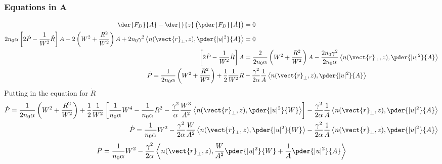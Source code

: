 \subsubsection{ Equations in A}
\begin{equation}
\begin{split}
    \der{F_{D}}{A}  - \der{}{z}\left(\pder{F_{D}}{\dot{A}}\right) &= 0 \\
    2n_0 \alpha \left[2\dot{P} - \frac{1}{W^2} \dot{R} \right] A  -  2 \left(W^2 + \frac{R^2}{W^2}\right) A +  2n_0 \gamma^2 \left< n(\vect{r}_{\perp},z),\pder{|u|^2}{A}\right> &= 0 \\
       \left[2\dot{P} - \frac{1}{W^2} \dot{R} \right] A  &=  \frac{2}{2n_0 \alpha} \left(W^2 + \frac{R^2}{W^2}\right) A -  \frac{2n_0 \gamma^2}{2n_0 \alpha} \left< n(\vect{r}_{\perp},z),\pder{|u|^2}{A}\right>\\
      \dot{P}   =  \frac{1}{2 n_0 \alpha}\left(W^2 +  \frac{R^2}{W^2}\right) 
      + \frac{1}{2} \frac{1}{W^2} \dot{R}
      &-  \frac{ \gamma^2 }{2 \alpha}\frac{1}{A}\left< n(\vect{r}_{\perp},z),\pder{|u|^2}{A}\right> \\
\end{split}
\end{equation}
Putting in the equation for $\dot{R}$
\begin{equation}
\begin{split}
      \dot{P}   =  \frac{1}{2 n_0 \alpha}\left(W^2 + \frac{R^2}{W^2}\right) 
      + \frac{1}{2} \frac{1}{W^2}\left[\frac{1}{n_0 \alpha} W^4 - \frac{1}{n_0 \alpha} R^2  - \frac{ \gamma^2 }{\alpha} \frac{W^3}{A^2 } \left< n(\vect{r}_{\perp},z),\pder{|u|^2}{W}\right>\right]
      &-  \frac{ \gamma^2 }{2 \alpha}\frac{1}{A}\left< n(\vect{r}_{\perp},z),\pder{|u|^2}{A}\right> \\
      \dot{P}   =  \frac{1}{n_0 \alpha}W^2
       -  \frac{ \gamma^2 }{2 \alpha} \frac{W}{A^2 } \left<n(\vect{r}_{\perp},z),\pder{|u|^2}{W}\right>
      &-  \frac{ \gamma^2 }{2 \alpha}\frac{1}{A}\left< n(\vect{r}_{\perp},z),\pder{|u|^2}{A}\right> \\      
\end{split}
\end{equation}
\begin{equation}
\begin{split}
      \dot{P}   =  \frac{1}{n_0 \alpha} W^2  
       -  \frac{ \gamma^2 }{2 \alpha} \left<n(\vect{r}_{\perp},z),\frac{W}{A^2} \pder{|u|^2}{W} + \frac{1}{A}\pder{|u|^2}{A} \right>      
\end{split}
\end{equation}

